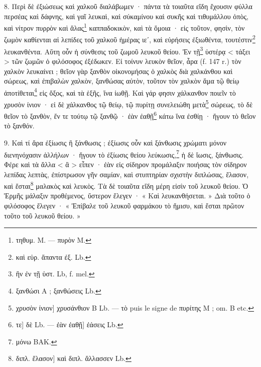 \documentclass[a4paper, 11pt, oneside, polutonikogreek, french]{article}
\begin{document}
8. Περὶ δὲ ἐξιώσεως καὶ χαλκοῦ διαλάβωμεν · πάντα τὰ τοιαῦτα εἴδη ἔχουσιν φύλλα περσέας καὶ δάφνης, καὶ γαῖ λευκαὶ, καὶ σύκαμίνου καὶ συκῆς καὶ τιθυμάλλου ὀπὸς, καὶ νίτρον πυρρὸν καὶ ἅλας\footnote{τηθυμ. M. --- πυρὸν M.} καππαδοκικὸν, καὶ τὰ ὅμοια · εἰς τοῦτον, φησὶν, τὸν ζωμὸν καθίενται αἱ λεπίδες τοῦ χαλκοῦ ἡμέρας ιεʹ, καὶ εὑρήσεις ἐξιωθέντα, τουτέστιν\footnote{καὶ εὑρ. ἅπαντα ἐξ. Lb.} λευκανθέντα. Αὕτη οὖν ἡ σύνθεσις τοῦ ζωμοῦ λευκοῦ θείου. Ἐν τῇ\footnote{ἣν ἐν τῇ ὑστ. Lb, f. mel.} ὑστέρᾳ < τάξει > τῶν ζωμῶν ὁ φιλόσοφος ἐξέδωκεν. Εἰ τοίνυν λευκὸν θεῖον, ἆρα (f. 147 r.) τὸν χαλκὸν λευκαίνει ; θεῖον γὰρ ξανθὸν οἰκονομήσας ὁ χαλκὸς διὰ χαλκάνθου καὶ σώρεως, καὶ ἐπιβαλὼν χαλκὸν, ξανθώσας αὐτὸν, τοῦτον τὸν χαλκὸν ἅμα τῷ θείῳ ἀποτίθεται\footnote{ξανθώσι A ; ξανθώσεις Lb.} εἰς ὄξος, καὶ τὰ ἑξῆς, ἵνα ἰωθῇ. Καὶ γάρ φησιν χάλκανθον ποιεῖν τὸ χρυσὸν ίνιον · εἰ δὲ χάλκανθος τῷ θείῳ, τῷ πυρίτῃ συνελειώθη μετὰ\footnote{χρυσὸν ίνιον] χρυσάνθιον B Lb. --- τὸ puis le signe de πυρίτης M ; om. B etc.} σώρεως, τὸ δὲ θεῖον τὸ ξανθὸν, ἔν τε τούτῳ τῷ ξανθῷ · ἐὰν ἐαθῇ\footnote{τε] δὲ Lb. --- ἐὰν ἐαθῇ] ἐάσεις Lb.} κάτω ἵνα ἐσθίῃ · ἤγουν τὸ θεῖον τὸ ξανθόν.

9. Καὶ τί ἄρα ἐξίωσις ἢ ξάνθωσις ; ἐξίωσις οὖν καὶ ξάνθωσις χρώματι μόνον διενηνόχασιν ἀλλήλων · ἤγουν τὸ ἐξίωσις θείου λεύκωσις,\footnote{μόνω BAK.} ἡ δὲ ἴωσις, ξάνθωσις. Φέρε καὶ τὰ ἄλλα < ἃ > εἶπεν · ἐὰν εἰς σίδηρον προμάλαξιν ποιήσας τὸν σίδηρον λεπίδας λεπτὰς, ἐπίστρωσον γῆν σαμίαν, καὶ στυπτηρίαν σχιστὴν διπλώσας, ἔλασον, καὶ ἔσται\footnote{διπλ. ἔλασον] καὶ διπλ. ἄλλασσεν Lb.} μαλακὸς καὶ λευκὸς. Τὰ δὲ τοιαῦτα εἴδη μέρη εἰσὶν τοῦ λευκοῦ θείου. Ὁ Ἑρμῆς μάλαξιν προθέμενος, ὔστερον ἔλεγεν · « Καὶ λευκανθήσεται. » Διὰ τοῦτο ὁ φιλόσοφος ἔλεγεν · « Ἐπίβαλε τοῦ λευκοῦ φαρμάκου τὸ ἥμισυ, καὶ ἔσται πρῶτον τοῦτο τοῦ λευκοῦ θείου. »
\end{document}
